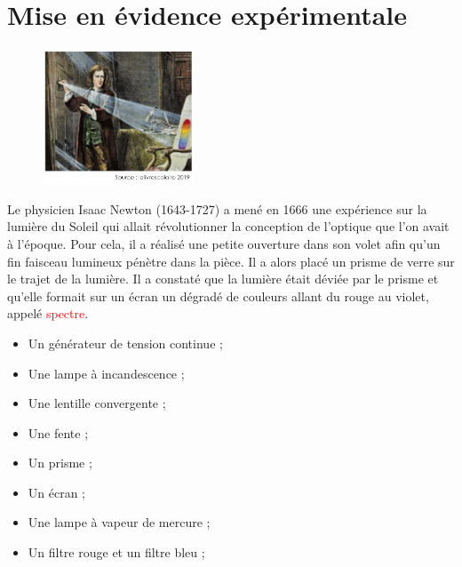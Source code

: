 \section{Mise en évidence expérimentale}
\begin{tcolorbox}[colback=orange!5!white,colframe=orange!75!black,title= Expérience d'Isaac Newton :]
\begin{figure}
\vspace{-0.6cm}
    \centering
     \includegraphics[width=0.4\textwidth]{Images/Isaac_Newton.PNG}
   \end{figure}
Le physicien Isaac Newton (1643-1727) a mené en 1666 une expérience sur la lumière du Soleil qui allait révolutionner la conception de l'optique que l'on avait à l'époque. Pour cela, il a réalisé une petite ouverture dans son volet afin qu'un fin faisceau lumineux pénètre dans la pièce. Il a alors placé un prisme de verre sur le trajet de la lumière. Il a constaté que la lumière était déviée par le prisme et qu'elle formait sur un écran un dégradé de couleurs allant du rouge au violet, appelé \textcolor{red}{spectre}.\\

\end{tcolorbox}

\begin{mdframed}[style=autreexo]
\textbf{}
\begin{multicols}{2}
    \begin{itemize}
    \item Un générateur de tension continue ;
    \item Une lampe à incandescence ;
    \item Une lentille convergente ;
    \item Une fente ;
    \item Un prisme ;
    \item Un écran ;
    \item Une lampe à vapeur de mercure ;
    \item Un filtre rouge et un filtre bleu ;
\end{itemize}
\end{multicols}
\end{mdframed}

